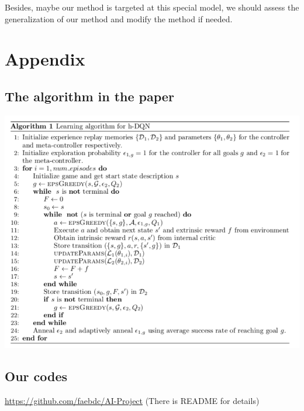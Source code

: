 \documentclass{article}
\newcommand{\Acknowledgement}[1]{\ \\{\bf Acknowledgement:} #1}
\begin{document}
\begin{spacing}{1.1}
    Besides, maybe our method is targeted at this special model, we should assess the generalization of our method and modify the method if needed.


    \section*{Appendix}

    \subsection*{The algorithm in the paper}
    \begin{center}
        \includegraphics[width = \textwidth]{pseudo.png}
    \end{center}

    \subsection*{Our codes}\label{code}
    \url{https://github.com/faebdc/AI-Project}
    (There is README for details)

    
    



    \end{spacing}
    
\end{document}

